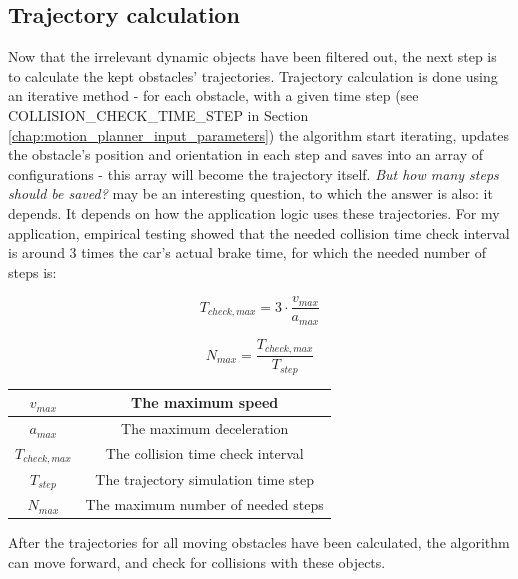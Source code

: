 \subsection{Trajectory calculation}
\label{trajectory_calculation}
Now that the irrelevant dynamic objects have been filtered out, the next step is to calculate the kept obstacles' trajectories. Trajectory calculation is done using an iterative method - for each obstacle, with a given time step (see COLLISION\_CHECK\_TIME\_STEP in Section \ref{chap:motion_planner_input_parameters}) the algorithm start iterating, updates the obstacle's position and orientation in each step and saves into an array of configurations - this array will become the trajectory itself. \textit{But how many steps should be saved?} may be an interesting question, to which the answer is also: it depends. It depends on how the application logic uses these trajectories. For my application, empirical testing showed that the needed collision time check interval is around 3 times the car's actual brake time, for which the needed number of steps is:

\begin{equation}\label{eq:collision_check_time_max}
T_{check,max} = 3 \cdot \frac{v_{max}}{a_{max}}
\end{equation}

\begin{equation}\label{eq:collision_check_steps_max}
N_{max} = \frac{T_{check,max}}{T_{step}}
\end{equation}

\begin{center}
    \begin{tabular}{ | c | c | }
        \hline
        $v_{max}$       & The maximum speed                     \\
        \hline
        $a_{max}$       & The maximum deceleration              \\
        \hline
        $T_{check,max}$ & The collision time check interval     \\
        \hline
        $T_{step}$      & The trajectory simulation time step   \\
        \hline
        $N_{max}$       & The maximum number of needed steps    \\
        \hline
    \end{tabular}
\end{center}

After the trajectories for all moving obstacles have been calculated, the algorithm can move forward, and check for collisions with these objects.

